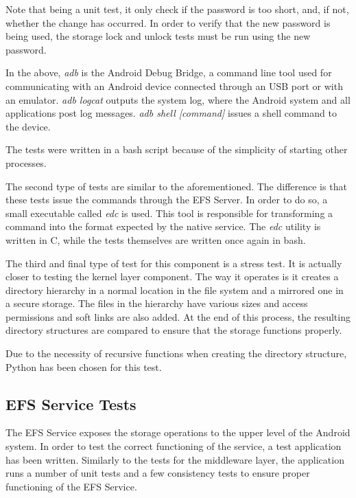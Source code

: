 Note that being a unit test, it only check if the password is too short, and, if not, whether the change has occurred. In order to verify that the new password is being used, the storage lock and unlock tests must be run using the new password.

In the above, \textit{adb} is the Android Debug Bridge, a command line tool used for communicating with an Android device connected through an USB port or with an emulator. \textit{adb logcat} outputs the system log, where the Android system and all applications post log messages. \textit{adb shell [command]} issues a shell command to the device.

The tests were written in a bash script because of the simplicity of starting other processes.

The second type of tests are similar to the aforementioned. The difference is that these tests issue the commands through the EFS Server. In order to do so, a small executable called \textit{edc} is used. This tool is responsible for transforming a command into the format expected by the native service. The \textit{edc} utility is written in C, while the tests themselves are written once again in bash.

The third and final type of test for this component is a stress test. It is actually closer to testing the kernel layer component. The way it operates is it creates a directory hierarchy in a normal location in the file system and a mirrored one in a secure storage. The files in the hierarchy have various sizes and access permissions and soft links are also added. At the end of this process, the resulting directory structures are compared to ensure that the storage functions properly.

Due to the necessity of recursive functions when creating the directory structure, Python has been chosen for this test.

\subsection{EFS Service Tests}
\label{sub-sec:efs-service-tests-eval}

The EFS Service exposes the storage operations to the upper level of the Android system. In order to test the correct functioning of the service, a test application has been written. Similarly to the tests for the middleware layer, the application runs a number of unit tests and a few consistency tests to ensure proper functioning of the EFS Service.

